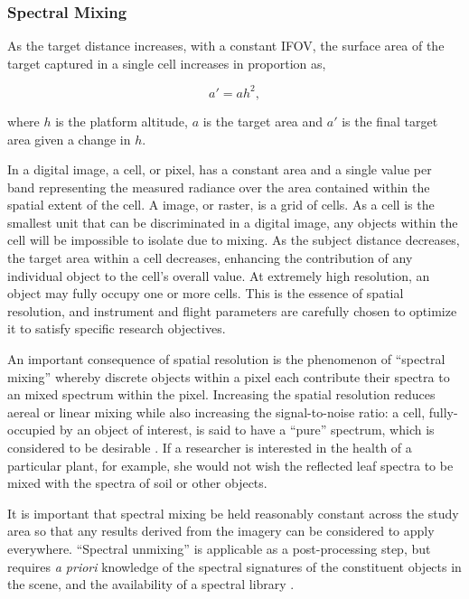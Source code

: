\subsubsection*{Spectral Mixing}

As the target distance increases, with a constant IFOV, the surface area of the target captured in a single cell increases in proportion as, 

\begin{equation}
a\prime = a h^2,
\end{equation}

where $h$ is the platform altitude, $a$ is the target area and $a\prime$ is the final target area given a change in $h$. 

In a digital image, a cell, or pixel, has a constant area and a single value per band representing the measured radiance over the area contained within the spatial extent of the cell. A image, or raster, is a grid of cells. As a cell is the smallest unit that can be discriminated in a digital image, any objects within the cell will be impossible to isolate due to mixing. As the subject distance decreases, the target area within a cell decreases, enhancing the contribution of any individual object to the cell's overall value. At extremely high resolution, an object may fully occupy one or more cells. This is the essence of spatial resolution, and instrument and flight parameters are carefully chosen to optimize it to satisfy specific research objectives. 

An important consequence of spatial resolution is the phenomenon of ``spectral mixing'' whereby discrete objects within a pixel each contribute their spectra to an mixed spectrum within the pixel. Increasing the spatial resolution reduces aereal or linear mixing \cite{Gupta2018} while also increasing the signal-to-noise ratio: a cell, fully-occupied by an object of interest, is said to have a ``pure'' spectrum, which is considered to be desirable \cite{Gupta2018}. If a researcher is interested in the health of a particular plant, for example, she would not wish the reflected leaf spectra to be mixed with the spectra of soil or other objects. 

It is important that spectral mixing be held reasonably constant across the study area so that any results derived from the imagery can be considered to apply everywhere. ``Spectral unmixing'' is applicable as a post-processing step, but requires \emph{a priori} knowledge of the spectral signatures of the constituent objects in the scene, and the availability of a spectral library \cite{Adams1986,Smith1990,Gupta2018}.




